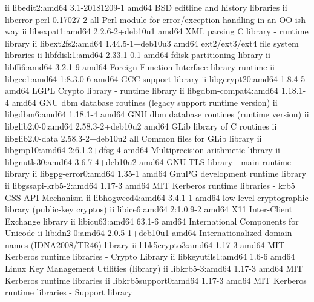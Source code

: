 ii  libedit2:amd64             3.1-20181209-1              amd64        BSD editline and history libraries
ii  liberror-perl              0.17027-2                   all          Perl module for error/exception handling in an OO-ish way
ii  libexpat1:amd64            2.2.6-2+deb10u1             amd64        XML parsing C library - runtime library
ii  libext2fs2:amd64           1.44.5-1+deb10u3            amd64        ext2/ext3/ext4 file system libraries
ii  libfdisk1:amd64            2.33.1-0.1                  amd64        fdisk partitioning library
ii  libffi6:amd64              3.2.1-9                     amd64        Foreign Function Interface library runtime
ii  libgcc1:amd64              1:8.3.0-6                   amd64        GCC support library
ii  libgcrypt20:amd64          1.8.4-5                     amd64        LGPL Crypto library - runtime library
ii  libgdbm-compat4:amd64      1.18.1-4                    amd64        GNU dbm database routines (legacy support runtime version) 
ii  libgdbm6:amd64             1.18.1-4                    amd64        GNU dbm database routines (runtime version) 
ii  libglib2.0-0:amd64         2.58.3-2+deb10u2            amd64        GLib library of C routines
ii  libglib2.0-data            2.58.3-2+deb10u2            all          Common files for GLib library
ii  libgmp10:amd64             2:6.1.2+dfsg-4              amd64        Multiprecision arithmetic library
ii  libgnutls30:amd64          3.6.7-4+deb10u2             amd64        GNU TLS library - main runtime library
ii  libgpg-error0:amd64        1.35-1                      amd64        GnuPG development runtime library
ii  libgssapi-krb5-2:amd64     1.17-3                      amd64        MIT Kerberos runtime libraries - krb5 GSS-API Mechanism
ii  libhogweed4:amd64          3.4.1-1                     amd64        low level cryptographic library (public-key cryptos)
ii  libice6:amd64              2:1.0.9-2                   amd64        X11 Inter-Client Exchange library
ii  libicu63:amd64             63.1-6                      amd64        International Components for Unicode
ii  libidn2-0:amd64            2.0.5-1+deb10u1             amd64        Internationalized domain names (IDNA2008/TR46) library
ii  libk5crypto3:amd64         1.17-3                      amd64        MIT Kerberos runtime libraries - Crypto Library
ii  libkeyutils1:amd64         1.6-6                       amd64        Linux Key Management Utilities (library)
ii  libkrb5-3:amd64            1.17-3                      amd64        MIT Kerberos runtime libraries
ii  libkrb5support0:amd64      1.17-3                      amd64        MIT Kerberos runtime libraries - Support library
